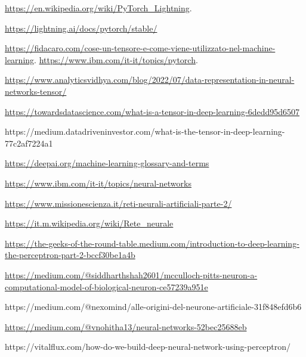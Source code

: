 \begin{thebibliography}{99}
\url{https://en.wikipedia.org/wiki/PyTorch_Lightning}.

\url{https://lightning.ai/docs/pytorch/stable/}

\url{https://fidacaro.com/cose-un-tensore-e-come-viene-utilizzato-nel-machine-learning}.
\url{https://www.ibm.com/it-it/topics/pytorch}.

\url{https://www.analyticsvidhya.com/blog/2022/07/data-representation-in-neural-networks-tensor/}

\url{https://towardsdatascience.com/what-is-a-tensor-in-deep-learning-6dedd95d6507}

https://medium.datadriveninvestor.com/what-is-the-tensor-in-deep-learning-77c2af7224a1

\url{https://deepai.org/machine-learning-glossary-and-terms}



\url{https://www.ibm.com/it-it/topics/neural-networks}

\url{https://www.missionescienza.it/reti-neurali-artificiali-parte-2/}

\url{https://it.m.wikipedia.org/wiki/Rete_neurale}

\url{https://the-geeks-of-the-round-table.medium.com/introduction-to-deep-learning-the-perceptron-part-2-bccf30be1a4b}

\url{https://medium.com/@siddharthshah2601/mcculloch-pitts-neuron-a-computational-model-of-biological-neuron-ce57239a951e}


https://medium.com/@nexomind/alle-origini-del-neurone-artificiale-31f848efd6b6

\url{https://medium.com/@vnohitha13/neural-networks-52bec25688eb}

https://vitalflux.com/how-do-we-build-deep-neural-network-using-perceptron/


\end{thebibliography}

